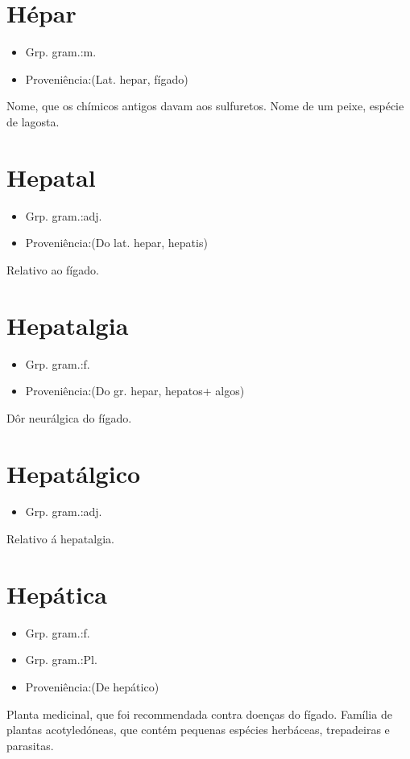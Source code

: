 \documentclass{article}
\begin{document}
\section{Hépar}
\begin{itemize}
\item {Grp. gram.:m.}
\end{itemize}
\begin{itemize}
\item {Proveniência:(Lat. \textunderscore hepar\textunderscore , fígado)}
\end{itemize}
Nome, que os chímicos antigos davam aos sulfuretos.
Nome de um peixe, espécie de lagosta.
\section{Hepatal}
\begin{itemize}
\item {Grp. gram.:adj.}
\end{itemize}
\begin{itemize}
\item {Proveniência:(Do lat. \textunderscore hepar\textunderscore , \textunderscore hepatis\textunderscore )}
\end{itemize}
Relativo ao fígado.
\section{Hepatalgia}
\begin{itemize}
\item {Grp. gram.:f.}
\end{itemize}
\begin{itemize}
\item {Proveniência:(Do gr. \textunderscore hepar\textunderscore , \textunderscore hepatos\textunderscore  + \textunderscore algos\textunderscore )}
\end{itemize}
Dôr neurálgica do fígado.
\section{Hepatálgico}
\begin{itemize}
\item {Grp. gram.:adj.}
\end{itemize}
Relativo á hepatalgia.
\section{Hepática}
\begin{itemize}
\item {Grp. gram.:f.}
\end{itemize}
\begin{itemize}
\item {Grp. gram.:Pl.}
\end{itemize}
\begin{itemize}
\item {Proveniência:(De \textunderscore hepático\textunderscore )}
\end{itemize}
Planta medicinal, que foi recommendada contra doenças do fígado.
Família de plantas acotyledóneas, que contém pequenas espécies herbáceas, trepadeiras e parasitas.
\end{document}
